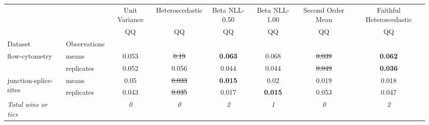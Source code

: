 \begin{tabular}{ll|c|c|c|c|c|c}
\toprule
{} & {} & {Unit Variance} & {Heteroscedastic} & {Beta NLL-0.50} & {Beta NLL-1.00} & {Second Order Mean} & {Faithful Heteroscedastic} \\
{} & {} & {QQ} & {QQ} & {QQ} & {QQ} & {QQ} & {QQ} \\
{Dataset} & {Observations} & {} & {} & {} & {} & {} & {} \\
\midrule
\multirow[c]{2}{*}{flow-cytometry} & means & 0.053 & \sout{0.19} & \textbf{0.063} & 0.068 & \sout{0.039} & \textbf{0.062} \\
 & replicates & 0.052 & 0.056 & 0.044 & 0.044 & \sout{0.049} & \textbf{0.036} \\
\multirow[c]{2}{*}{junction-splice-sites} & means & 0.05 & \sout{0.033} & \textbf{0.015} & 0.02 & 0.019 & 0.018 \\
 & replicates & 0.043 & \sout{0.035} & 0.017 & \textbf{0.015} & 0.053 & 0.047 \\
\textit{{Total wins or ties}} &  & \textit{0} & \textit{0} & \textit{2} & \textit{1} & \textit{0} & \textit{2} \\
\bottomrule
\end{tabular}
